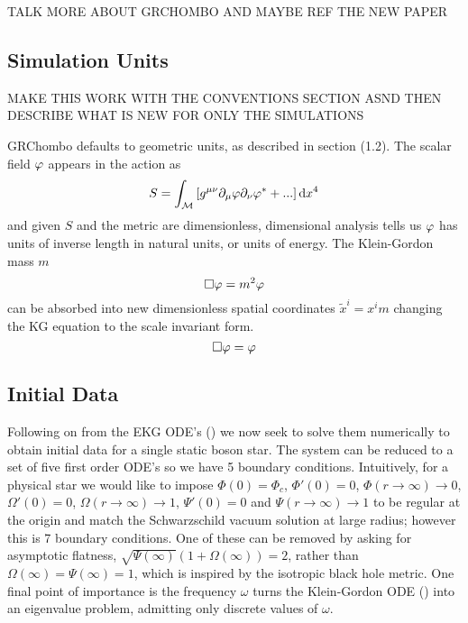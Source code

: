 TALK MORE ABOUT GRCHOMBO AND MAYBE REF THE NEW PAPER


\subsection{Simulation Units}
MAKE THIS WORK WITH THE CONVENTIONS SECTION ASND THEN DESCRIBE WHAT IS NEW FOR ONLY THE SIMULATIONS

GRChombo defaults to geometric units, as described in section (1.2). The scalar field $\varphi$ appears in the action as
\begin{equation} S = \int_{\mathcal{M}} \left[g^{\mu\nu}\partial_\mu \varphi \partial_\nu \varphi^* + ... \right]\dd x^4\end{equation}
and given $S$ and the metric are dimensionless, dimensional analysis tells us $\varphi$ has units of inverse length in natural units, or units of energy. The Klein-Gordon mass $m$
\begin{equation} \Box \varphi = m^2 \varphi\end{equation}
can be absorbed into new dimensionless spatial coordinates $\tilde{x}^i = x^i m$ changing the KG equation to the scale invariant form.
\begin{equation} \Box \varphi = \varphi\end{equation}



\subsection{Initial Data}
Following on from the EKG ODE's () we now seek to solve them numerically to obtain initial data for a single static boson star. The system can be reduced to a set of five first order ODE's so we have 5 boundary conditions. Intuitively, for a physical star we would like to impose $\Phi(0) = \Phi_c$, $\Phi'(0)=0$, $\Phi(r\rightarrow\infty)\rightarrow0$, $\Omega'(0)=0$, $\Omega(r\rightarrow\infty)\rightarrow1$, $\Psi'(0)=0$ and $\Psi(r\rightarrow\infty)\rightarrow1$ to be regular at the origin and match the Schwarzschild vacuum solution at large radius; however this is 7 boundary conditions. One of these can be removed by asking for asymptotic flatness, $\sqrt{\Psi(\infty)}\left(1+\Omega(\infty)\right)=2$, rather than $\Omega(\infty)=\Psi(\infty)=1$, which is inspired by the isotropic black hole metric. One final point of importance is the frequency $\omega$ turns the Klein-Gordon ODE () into an eigenvalue problem, admitting only discrete values of $\omega$.

